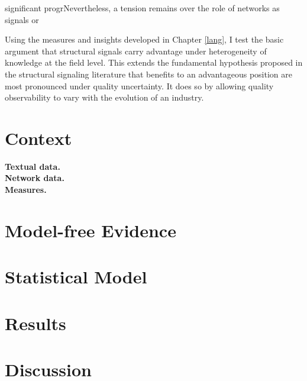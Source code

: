  significant progrNevertheless, a tension remains over the role of networks as signals or 

Using the measures and insights developed in Chapter \ref{lang}, I test the basic argument that structural signals carry advantage under heterogeneity of knowledge at the field level. This extends the fundamental hypothesis proposed in the structural signaling literature that benefits to an advantageous position are most pronounced under quality uncertainty. It does so by allowing quality observability to vary with the evolution of an industry. 

\section{Context}
\textbf{Textual data.}\\
\textbf{Network data.}\\
\textbf{Measures.}\\
\section{Model-free Evidence}
\section{Statistical Model}
\section{Results}
\section{Discussion}